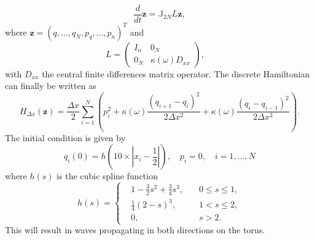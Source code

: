 \documentclass[final]{siamart}
\begin{document}
\begin{equation} \label{eq:NuRe:5}
	\frac{d}{dt} \mathbf z = \mathbb{J}_{2N} L\mathbf z,
\end{equation}
where $\mathbf z=(q,\dots,q_N,p_q,\dots,p_n)^T$ and
\begin{equation} \label{eq:NuRe:6}
L = 
\begin{pmatrix}
	I_n & 0_N \\
	0_N & \kappa(\omega)D_{xx}
\end{pmatrix},\quad 
\end{equation}
with $D_{xx}$ the central finite differences matrix operator. The discrete Hamiltonian can finally be written as
\begin{equation} \label{eq:NuRe:7}
	H_{\Delta x}(\mathbf z) = \frac{\Delta x}2 \sum_{i=1}^{N} \left( p_i^2 + \kappa(\omega) \frac{(q_{i+1} - q_i)^2}{2\Delta x ^ 2} + \kappa(\omega) \frac{(q_{i} - q_{i-1})^2}{2\Delta x ^ 2} \right).
\end{equation}
The initial condition is given by
\begin{equation} \label{eq:NuRe:8}
	q_i(0) = h( 10\times|x_i - \frac{1}{2}| ), \quad p_i = 0, \quad i=1,\dots,N
\end{equation}
where $h(s)$ is the cubic spline function
\begin{equation} \label{eq:NuRe:9}
h(s) = 
\left\{
\begin{aligned}
& 1 - \frac{3}{2}s^2 + \frac{3}{4}s^3, \quad & 0\leq s \leq 1, \\
& \frac{1}{4}(2-s)^3, & 1< s \leq 2, \\
& 0, & s > 2.
\end{aligned}
\right.
\end{equation}
This will result in waves propagating in both directions on the torus.
\end{document}
